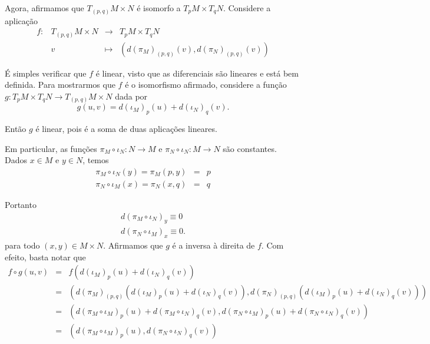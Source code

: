 \documentclass[twoside,openright,titlepage,numbers=noenddot,headinclude,  lineheaders footinclude=true,cleardoublepage=empty,BCOR=5mm,paper=a4,fontsize=12pt ]{scrbook}
\begin{document}
Agora, afirmamos que $T_{(p,q)}M \times N$ é isomorfo a $T_pM \times T_q N$. Considere a aplicação
\begin{equation*}
    \begin{array}{ccccc}
        f:& T_{(p,q)} M \times N &\longrightarrow &T_p M \times T_q N\\
        &v & \longmapsto &\left(d(\pi_M)_{(p,q)}(v),d(\pi_N)_{(p,q)}(v)\right)
    \end{array}
\end{equation*}

É simples verificar que $f$ é linear, visto que as diferenciais são lineares e está bem definida. Para mostrarmos que $f$ é o isomorfismo afirmado, considere a função $g:T_p M \times T_q N \longrightarrow T_{(p,q)}M \times N$ dada por 
\begin{equation*}
    g(u,v) = d(\iota_M)_p(u) + d(\iota_N)_q(v). 
\end{equation*}

Então $g$ é linear, pois é a soma de duas aplicações lineares.

Em particular, as funções $\pi_M \circ \iota_N: N \longrightarrow M$ e $\pi_N \circ \iota_N: M \longrightarrow N$ são constantes. Dados $x \in M$ e $y \in N$, temos 
 \begin{eqnarray*}
     \pi_M \circ \iota_N(y) = \pi_M(p,y) &=& p\\
     \pi_N \circ \iota_M(x) = \pi_N(x,q) &=& q
 \end{eqnarray*}
 
Portanto 
\begin{eqnarray*}
    d(\pi_M \circ \iota_N)_y \equiv 0\\
    d(\pi_N \circ \iota_M)_x \equiv 0.
\end{eqnarray*}
para todo $(x,y) \in M \times N$. Afirmamos que $g$ é a inversa à direita de $f$. Com efeito, basta notar que 
\begin{eqnarray*}
     f \circ g(u,v) &=& f(d(\iota_M)_p(u) + d(\iota_N)_q(v))\\
     &=&\left(d(\pi_M)_{(p, q)}(d(\iota_M)_p(u) + d(\iota_N)_q(v)),d(\pi_N)_{(p, q)}(d(\iota_M)_p(u) + d(\iota_N)_q(v))\right)\\
     &=&\left(d(\pi_M \circ \iota_M)_p(u) + d(\pi_M \circ \iota_N)_q(v),d(\pi_N \circ \iota_M)_p(u) + d(\pi_N \circ \iota_N)_q(v)\right)\\
     &=&\left(d(\pi_M \circ \iota_M)_p(u), d(\pi_N \circ \iota_N)_q(v)\right)
\end{eqnarray*}
 
\end{document}
